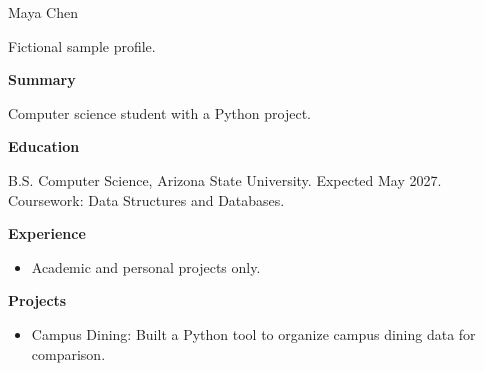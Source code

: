 \documentclass[11pt]{article}
\begin{document}
{\LARGE
Maya Chen
}

Fictional sample profile.

\vspace{0.6em}
\textbf{Summary}

Computer science student with a Python project.

\vspace{0.6em}
\textbf{Education}

B.S. Computer Science, Arizona State University. Expected May 2027. Coursework: Data Structures and Databases.

\vspace{0.6em}
\textbf{Experience}

\begin{itemize}
\item Academic and personal projects only.
\end{itemize}

\vspace{0.6em}
\textbf{Projects}

\begin{itemize}
\item Campus Dining: Built a Python tool to organize campus dining data for comparison.
\end{itemize}
\end{document}
